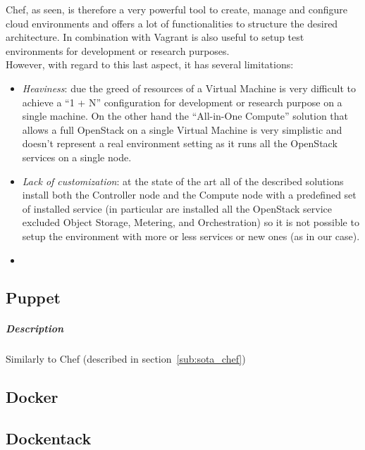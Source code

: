 Chef, as seen, is therefore a very powerful tool to create, manage and configure cloud environments and offers a lot of functionalities to structure the desired architecture. In combination with Vagrant is also useful to setup test environments for development or research purposes.\\
However, with regard to this last aspect, it has several limitations:
\begin{itemize}
\item \textit{Heaviness}: due the greed of resources of a Virtual Machine is very difficult to achieve a ``1 + N'' configuration for development or research purpose on a single machine. On the other hand the ``All-in-One Compute'' solution that allows a full OpenStack on a single Virtual Machine is very simplistic and doesn't represent a real environment setting as it runs all the OpenStack services on a single node.
\item \textit{Lack of customization}: at the state of the art all of the described solutions install both the Controller node and the Compute node with a predefined set of installed service (in particular are installed all the OpenStack service excluded Object Storage, Metering, and Orchestration) so it is not possible to setup the environment with more or less services or new ones (as in our case).
\item {}
\end{itemize}

\subsection{Puppet}
\label{sub:sota_puppet}

\subparagraph{Description}
\label{subp:sota_puppet_desc}

Similarly to Chef (described in section~\ref{sub:sota_chef}) 

\subsection{Docker}
\label{sub:sota_docker}

\subsection{Dockentack}
\label{sub:sota_dockenstack}

